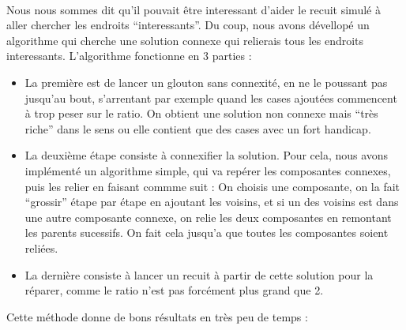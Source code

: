 \documentclass[a4paper, 11pt]{article} %
\begin{document}
\paragraph*{}
Nous nous sommes dit qu'il pouvait être interessant d'aider le recuit simulé à aller chercher les endroits ``interessants''. Du coup, nous avons dévellopé un algorithme qui cherche une solution connexe qui relierais tous les endroits interessants. L'algorithme fonctionne en 3 parties :
\begin{itemize}
\item La première est de lancer un glouton sans connexité, en ne le poussant pas jusqu'au bout, s'arrentant par exemple quand les cases ajoutées commencent à trop peser sur le ratio. On obtient une solution non connexe mais ``très riche'' dans le sens ou elle contient que des cases avec un fort handicap.
\item La deuxième étape consiste à connexifier la solution. Pour cela, nous avons implémenté un algorithme simple, qui va repérer les composantes connexes, puis les relier en faisant commme suit : On choisis une composante, on la fait ``grossir'' étape par étape en ajoutant les voisins, et si un des voisins est dans une autre composante connexe, on relie les deux composantes en remontant les parents sucessifs. On fait cela jusqu'a que toutes les composantes soient reliées.
\item La dernière consiste à lancer un recuit à partir de cette solution pour la réparer, comme le ratio n'est pas forcément plus grand que 2.
\end{itemize}
Cette méthode donne de bons résultats en très peu de temps : 
\end{document}
